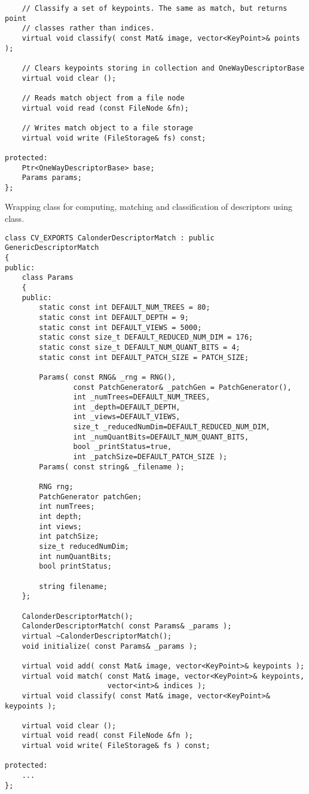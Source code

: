 \begin{lstlisting}
    // Classify a set of keypoints. The same as match, but returns point 
    // classes rather than indices.
    virtual void classify( const Mat& image, vector<KeyPoint>& points );

    // Clears keypoints storing in collection and OneWayDescriptorBase
    virtual void clear ();

    // Reads match object from a file node
    virtual void read (const FileNode &fn);
    
    // Writes match object to a file storage
    virtual void write (FileStorage& fs) const;

protected:
    Ptr<OneWayDescriptorBase> base;
    Params params;
};
\end{lstlisting}

Wrapping class for computing, matching and classification of descriptors using  class.

\begin{lstlisting}
class CV_EXPORTS CalonderDescriptorMatch : public GenericDescriptorMatch
{
public:
    class Params
    {
    public:
        static const int DEFAULT_NUM_TREES = 80;
        static const int DEFAULT_DEPTH = 9;
        static const int DEFAULT_VIEWS = 5000;
        static const size_t DEFAULT_REDUCED_NUM_DIM = 176;
        static const size_t DEFAULT_NUM_QUANT_BITS = 4;
        static const int DEFAULT_PATCH_SIZE = PATCH_SIZE;

        Params( const RNG& _rng = RNG(), 
                const PatchGenerator& _patchGen = PatchGenerator(),
                int _numTrees=DEFAULT_NUM_TREES,
                int _depth=DEFAULT_DEPTH,
                int _views=DEFAULT_VIEWS,
                size_t _reducedNumDim=DEFAULT_REDUCED_NUM_DIM,
                int _numQuantBits=DEFAULT_NUM_QUANT_BITS,
                bool _printStatus=true,
                int _patchSize=DEFAULT_PATCH_SIZE );
        Params( const string& _filename );

        RNG rng;
        PatchGenerator patchGen;
        int numTrees;
        int depth;
        int views;
        int patchSize;
        size_t reducedNumDim;
        int numQuantBits;
        bool printStatus;

        string filename;
    };

    CalonderDescriptorMatch();
    CalonderDescriptorMatch( const Params& _params );
    virtual ~CalonderDescriptorMatch();
    void initialize( const Params& _params );

    virtual void add( const Mat& image, vector<KeyPoint>& keypoints );
    virtual void match( const Mat& image, vector<KeyPoint>& keypoints, 
                        vector<int>& indices );
    virtual void classify( const Mat& image, vector<KeyPoint>& keypoints );

    virtual void clear ();
    virtual void read( const FileNode &fn );
    virtual void write( FileStorage& fs ) const;
    
protected:
	...
};
\end{lstlisting}

